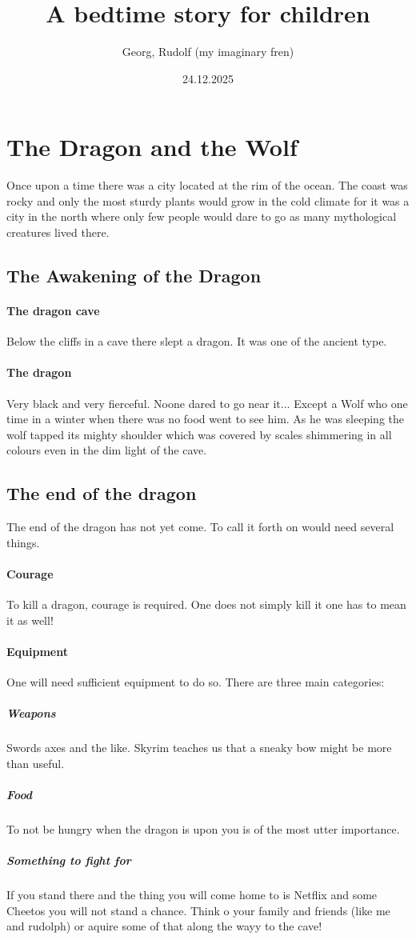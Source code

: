 \documentclass{article}
\author{Georg, Rudolf (my imaginary fren)}
\date{24.12.2025}
\title{A bedtime story for children}
\begin{document}
\maketitle
\newpage
{}

\section{The Dragon and the Wolf}

Once upon a time there was a city located at the rim of the ocean. The coast was rocky and only the most sturdy plants would grow in the cold climate for it was a city in the north where only few people would dare to go as many mythological creatures lived there. 

\subsection{The Awakening of the Dragon}

\paragraph{The dragon cave}Below the cliffs in a cave there slept a dragon. It was one of the ancient type.
\paragraph{The dragon}
Very black and very fierceful. Noone dared to go near it... Except a Wolf who one time in a winter when there was no food went to see him. As he was sleeping the wolf tapped its mighty shoulder which was covered by scales shimmering in all colours even in the dim light of the cave. 

\subsection{The end of the dragon}
The end of the dragon has not yet come. To call it forth on would need several things. 
\paragraph{Courage} To kill a dragon, courage is required. One does not simply kill it one has to mean it as well!
\paragraph{Equipment} One will need sufficient equipment to do so. There are three main categories:
\subparagraph{Weapons} Swords axes and the like. Skyrim teaches us that a sneaky bow might be more than useful.
\subparagraph{Food} To not be hungry when the dragon is upon you is of the most utter importance.
\subparagraph{Something to fight for} If you stand there and the thing you will come home to is Netflix and some Cheetos you will not stand a chance. Think o your family and friends (like me and rudolph) or aquire some of that along the wayy to the cave!
\end{document}
